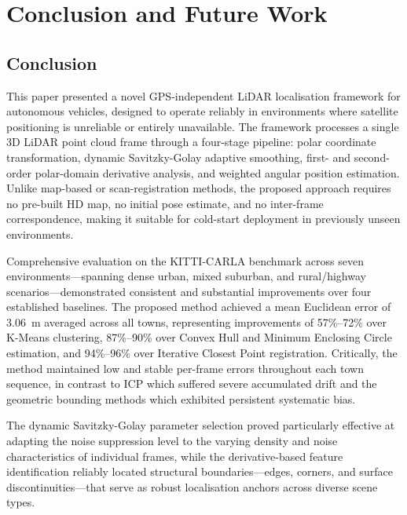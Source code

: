 \documentclass[lettersize,journal]{IEEEtran}
\begin{document}
\section{Conclusion and Future Work}\label{sec:conclusion}

\subsection{Conclusion}

This paper presented a novel GPS-independent LiDAR localisation framework for
autonomous vehicles, designed to operate reliably in environments where satellite
positioning is unreliable or entirely unavailable. The framework processes a
single 3D LiDAR point cloud frame through a four-stage pipeline: polar coordinate
transformation, dynamic Savitzky-Golay adaptive smoothing, first- and
second-order polar-domain derivative analysis, and weighted angular position
estimation. Unlike map-based or scan-registration methods, the proposed approach
requires no pre-built HD map, no initial pose estimate, and no inter-frame
correspondence, making it suitable for cold-start deployment in previously
unseen environments.

Comprehensive evaluation on the KITTI-CARLA benchmark across seven
environments---spanning dense urban, mixed suburban, and rural/highway
scenarios---demonstrated consistent and substantial improvements over four
established baselines. The proposed method achieved a mean Euclidean error of
3.06~m averaged across all towns, representing improvements of 57\%--72\% over
K-Means clustering, 87\%--90\% over Convex Hull and Minimum Enclosing Circle
estimation, and 94\%--96\% over Iterative Closest Point registration. Critically,
the method maintained low and stable per-frame errors throughout each town
sequence, in contrast to ICP which suffered severe accumulated drift and the
geometric bounding methods which exhibited persistent systematic bias.

The dynamic Savitzky-Golay parameter selection proved particularly effective at
adapting the noise suppression level to the varying density and noise
characteristics of individual frames, while the derivative-based feature
identification reliably located structural boundaries---edges, corners, and
surface discontinuities---that serve as robust localisation anchors across
diverse scene types.
\end{document}
